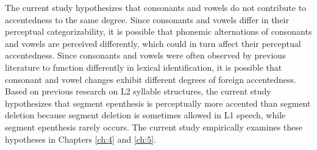 The current study hypothesizes that consonants and vowels do not contribute to accentedness to the same degree. Since consonants and vowels differ in their perceptual categorizability, it is possible that phonemic alternations of consonants and vowels are perceived differently, which could in turn affect their perceptual accentedness. Since consonants and vowels were often observed by previous literature to function differently in lexical identification, it is possible that consonant and vowel changes exhibit different degrees of foreign accentedness. Based on previous research on L2 syllable structures, the current study hypothesizes that segment epenthesis is perceptually more accented than segment deletion because segment deletion is sometimes allowed in L1 speech, while segment epenthesis rarely occurs. The current study empirically examines these hypotheses in Chapters \ref{ch:4} and \ref{ch:5}.












